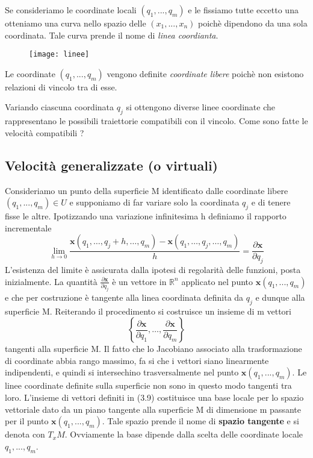 \begin{definition}
	Se consideriamo le coordinate locali $(q_1,...,q_m)$ e le fissiamo tutte eccetto una otteniamo una curva nello spazio delle $(x_1,...,x_n)$ poich\`{e} dipendono da una sola coordinata. Tale curva prende il nome di \textit{linea coordianta}.
\end{definition}

\begin{figure}[!ht]
\texttt{[image: linee]}	
\centering
\end{figure}

\begin{definition}
	Le coordinate $(q_1,...,q_m)$ vengono definite \textit{coordinate libere} poich\`{e} non esistono relazioni di vincolo tra di esse.
\end{definition}

\noindent Variando ciascuna coordinata $q_j$ si ottengono diverse linee coordinate che rappresentano le possibili traiettorie compatibili con il vincolo. Come sono fatte le velocit\`{a} compatibili ?

\subsection{Velocit\`{a} generalizzate (o virtuali)}

Consideriamo un punto della superficie M identificato dalle coordinate libere $(q_1,...,q_m) \in U$ e supponiamo di far variare solo la coordinata $q_j$ e di tenere fisse le altre. Ipotizzando una variazione infinitesima h definiamo il rapporto incrementale 
\begin{equation}
\lim _{h \rightarrow 0} \frac{\mathbf{x}\left(q_1, \ldots, q_j+h, \ldots, q_m\right)-\mathbf{x}\left(q_1, \ldots, q_j, \ldots, q_m\right)}{h}=\frac{\partial \mathbf{x}}{\partial q_j}
\end{equation}
L'esistenza del limite \`{e} assicurata dalla ipotesi di regolarit\`{a} delle funzioni, posta inizialmente. La quantit\`{a} $\frac{\partial \bm{x}}{\partial q_j}$ \`{e} un vettore in $\mathbb{R}^n$ applicato nel punto $\bm{x}(q_1,...,q_m)$ e che per costruzione \`{e} tangente alla linea coordinata definita da $q_j$ e dunque alla superficie M. Reiterando il procedimento si costruisce un insieme di m vettori 
\begin{equation}
\left\{\frac{\partial \mathbf{x}}{\partial q_1}, \ldots, \frac{\partial \mathbf{x}}{\partial q_m}\right\}
\end{equation}
tangenti alla superficie M. Il fatto che lo Jacobiano associato alla trasformazione di coordinate abbia rango massimo, fa si che i vettori siano linearmente indipendenti, e quindi si intersechino trasversalmente nel punto $\bm{x}(q_1,...,q_m)$. Le linee coordinate definite sulla superficie non sono in questo modo tangenti tra loro.
L'insieme di vettori definiti in (3.9) costituisce una base locale per lo spazio vettoriale dato da un piano tangente alla superficie M di dimensione m passante per il punto $\bm{x}(q_1,...,q_m)$. Tale spazio prende il nome di \textbf{spazio tangente} e si denota con $T_{x}M$.
Ovviamente la base dipende dalla scelta delle coordinate locale $q_1,...,q_m$.

